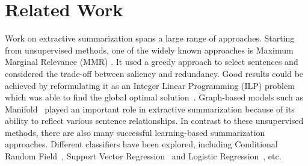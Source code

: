 \documentclass[letterpaper]{article}
\begin{document}
\section{Related Work}
Work on extractive summarization spans a large range of approaches.
Starting from unsupervised methods, one of the widely known approaches is Maximum Marginal Relevance (MMR) \cite{carbonell1998use}. It used a greedy approach to select sentences and considered the trade-off between saliency and redundancy.
Good results could be achieved by reformulating it as an Integer Linear Programming (ILP) problem which was able to find the global optimal solution~\cite{mcdonald2007study,gillick2009scalable}.
Graph-based models such as Manifold~\cite{wan2009graph} played an important role in extractive summarization because of its ability to reflect various sentence relationships.
In contrast to these unsupervised methods, there are also many successful learning-based summarization approaches.
Different classifiers have been explored, including Conditional Random Field~\cite{galley2006skip}, Support Vector Regression~\cite{li2007multi} and Logistic Regression~\cite{li2013using}, etc.
\end{document}
